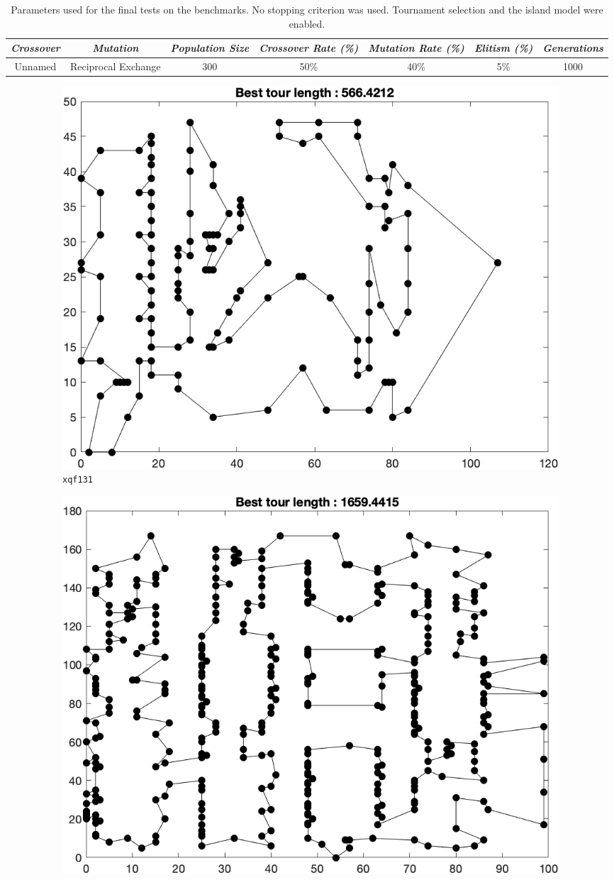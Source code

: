 \begin{table}[h]
\centering
\footnotesize
\begin{tabular}{c|c|c|c|c|c|c}
\textit{Crossover} & \textit{Mutation} & \textit{Population Size} & \textit{Crossover Rate (\%)} & \textit{Mutation Rate (\%)} & \textit{Elitism (\%)} & \textit{Generations} \\\hline 
Unnamed & Reciprocal Exchange & 300 & 50\% & 40\% & 5\% & 1000
\end{tabular}
\caption{Parameters used for the final tests on the benchmarks. No stopping criterion was used. Tournament selection and the island model were enabled.}
\label{tab:parb}
\end{table}

\begin{figure}[H]
	\centering
%
	\begin{subfigure}[b]{0.45\textwidth}
		\centering
		\includegraphics[width=\textwidth]{benchmarks/final/xqf131.png}
		\caption{\texttt{xqf131}}
    	\end{subfigure}
	\begin{subfigure}[b]{0.45\textwidth}
		\centering
		\includegraphics[width=\textwidth]{benchmarks/final/bcl380.png}

\end{subfigure}
\end{figure}
